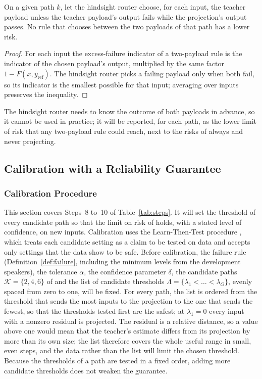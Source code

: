 \begin{proposition}\label{prop:oracle}
On a given path $k$, let the hindsight router choose, for each input, the teacher payload unless the teacher payload's output fails while the projection's output passes. No rule that chooses between the two payloads of that path has a lower risk.
\end{proposition}
\begin{proof}
For each input the excess-failure indicator of a two-payload rule is the indicator of the chosen payload's output, multiplied by the same factor $1-F(x,y_{\text{ref}})$. The hindsight router picks a failing payload only when both fail, so its indicator is the smallest possible for that input; averaging over inputs preserves the inequality.
\end{proof}
The hindsight router needs to know the outcome of both payloads in advance, so it cannot be used in practice; it will be reported, for each path, as the lower limit of risk that any two-payload rule could reach, next to the risks of always and never projecting.

\subsection{Calibration with a Reliability Guarantee}
\label{sec:obj3}

\subsubsection{Calibration Procedure}
\label{sec:calibration}

This section covers Steps~8 to~10 of Table~\ref{tab:steps}. It will set the threshold of every candidate path so that the limit on risk of  holds, with a stated level of confidence, on new inputs. Calibration uses the Learn-Then-Test procedure \parencite{angelopoulos2025ltt}, which treats each candidate setting as a claim to be tested on data and accepts only settings that the data show to be safe. Before calibration, the failure rule (Definition~\ref{def:failure}, including the minimum levels from the development speakers), the tolerance $\alpha$, the confidence parameter $\delta$, the candidate paths $\mathcal K=\{2,4,6\}$ of  and the list of candidate thresholds
$\Lambda=\{\lambda_1<\dots<\lambda_G\}$, evenly spaced from zero to one, will be fixed. For every path, the list is ordered from the threshold that sends the most inputs to the projection to the one that sends the fewest, so that the thresholds tested first are the safest; at $\lambda_1=0$ every input with a nonzero residual is projected. The residual is a relative distance, so a value above one would mean that the teacher's estimate differs from its projection by more than its own size; the list therefore covers the whole useful range in small, even steps, and the data rather than the list will limit the chosen threshold. Because the thresholds of a path are tested in a fixed order, adding more candidate thresholds does not weaken the guarantee.

